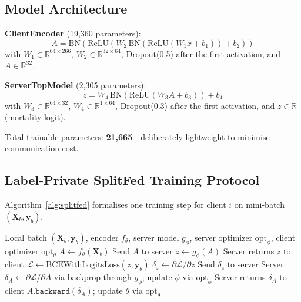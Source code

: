 \documentclass[10pt,twocolumn]{article}
\begin{document}
\subsection{Model Architecture}

\textbf{ClientEncoder} (19,360 parameters):
\begin{equation}
A = \text{BN}(\text{ReLU}(W_2\,\text{BN}(\text{ReLU}(W_1 x + b_1)) + b_2))
\end{equation}
with $W_1\!\in\!\mathbb{R}^{64\times266}$,
$W_2\!\in\!\mathbb{R}^{32\times64}$, Dropout(0.5) after the first
activation, and $A\in\mathbb{R}^{32}$.

\textbf{ServerTopModel} (2,305 parameters):
\begin{equation}
z = W_4\,\text{BN}(\text{ReLU}(W_3 A + b_3)) + b_4
\end{equation}
with $W_3\!\in\!\mathbb{R}^{64\times32}$,
$W_4\!\in\!\mathbb{R}^{1\times64}$, Dropout(0.3) after the first
activation, and $z\in\mathbb{R}$ (mortality logit).

Total trainable parameters: \textbf{21,665}---deliberately lightweight
to minimise communication cost.

\subsection{Label-Private SplitFed Training Protocol}

Algorithm~\ref{alg:splitfed} formalises one training step for client
$i$ on mini-batch $(\mathbf{X}_b, \mathbf{y}_b)$.

\begin{algorithm}[h]
\caption{Label-Private SplitFed --- one mini-batch}
\label{alg:splitfed}
\begin{algorithmic}[1]
\Require Local batch $(\mathbf{X}_b,\mathbf{y}_b)$, encoder $f_\theta$,
         server model $g_\phi$, server optimizer $\text{opt}_\phi$,
         client optimizer $\text{opt}_\theta$
\State $A \leftarrow f_\theta(\mathbf{X}_b)$
\State Send $A$ to server 
\State $z \leftarrow g_\phi(A)$
\State Server returns $z$ to client
\State $\mathcal{L} \leftarrow \text{BCEWithLogitsLoss}(z,\mathbf{y}_b)$
\State $\delta_z \leftarrow \partial\mathcal{L}/\partial z$
\State Send $\delta_z$ to server
\State Server: $\delta_A \leftarrow \partial\mathcal{L}/\partial A$
       via backprop through $g_\phi$; update $\phi$ via $\text{opt}_\phi$
\State Server returns $\delta_A$ to client
\State $A.\texttt{backward}(\delta_A)$; update $\theta$ via $\text{opt}_\theta$
\end{algorithmic}
\end{algorithm}
\end{document}

